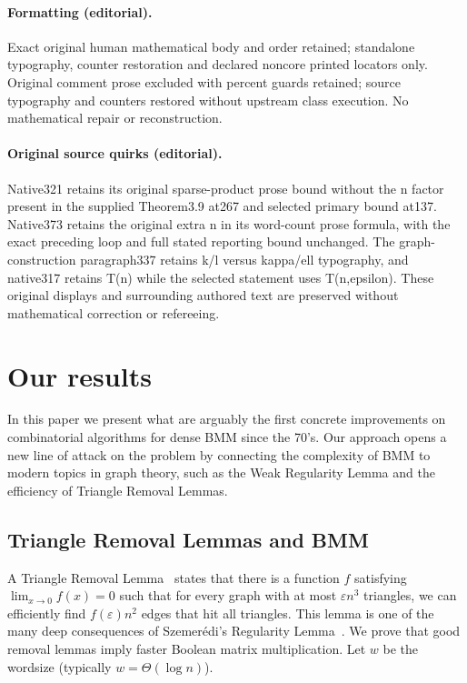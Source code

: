 \documentclass[10pt]{article}
\theoremstyle{definition}
\numberwithin{equation}{section}
\newcommand{\eps}{\varepsilon}
\begin{document}
\paragraph{Formatting (editorial).} Exact original human mathematical body and order retained; standalone typography, counter restoration and declared noncore printed locators only. Original comment prose excluded with percent guards retained; source typography and counters restored without upstream class execution. No mathematical repair or reconstruction.
\paragraph{Original source quirks (editorial).} Native321 retains its original sparse-product prose bound without the n factor present in the supplied Theorem3.9 at267 and selected primary bound at137. Native373 retains the original extra n in its word-count prose formula, with the exact preceding loop and full stated reporting bound unchanged. The graph-construction paragraph337 retains k/l versus kappa/ell typography, and native317 retains T(n) while the selected statement uses T(n,epsilon). These original displays and surrounding authored text are preserved without mathematical correction or refereeing.
\endgroup
\clearpage
\setcounter{section}{1}
\section{Our results}

In this paper we present what are arguably the first concrete improvements on combinatorial algorithms for dense BMM since the 70's. Our approach opens a new line of attack on the problem by connecting the complexity of BMM to modern topics in graph theory, such as the Weak Regularity Lemma and the efficiency of Triangle Removal Lemmas.

\subsection{Triangle Removal Lemmas and BMM}

A Triangle Removal Lemma~\cite{RuzsaSz,Green} states that there is a function $f$ satisfying $\lim_{x \rightarrow 0} f(x) = 0$ such that for every graph with at most $\eps n^3$ triangles, we can efficiently find $f(\eps) n^2$ edges that hit all triangles. This lemma is one of the many deep consequences of Szemer\'{e}di's Regularity Lemma~\cite{sz}. We prove that good removal lemmas imply faster Boolean matrix multiplication. Let $w$ be the wordsize (typically $w = \Theta(\log n)$).
\end{document}
